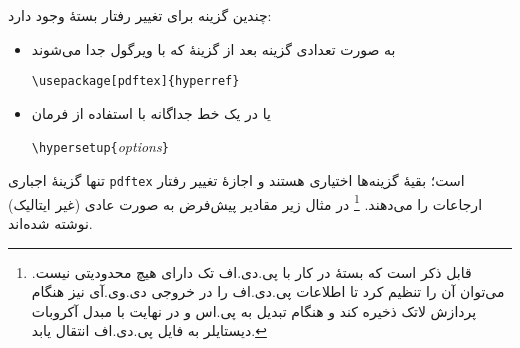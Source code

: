 {چندین گزینه برای تغییر رفتار بستهٔ  وجود دارد:
\begin{itemize}
\item  به صورت تعدادی گزینه بعد از گزینهٔ  که با ویرگول جدا می‌شوند

\setLR
 \verb+\usepackage[pdftex]{hyperref}+
\setRL

\item یا در یک خط جداگانه با استفاده از فرمان
 
\setLR
 \verb+\hypersetup{+\emph{options}\verb+}+
\setRL

\end{itemize}

تنها گزینهٔ اجباری \texttt{pdftex} است؛ بقیهٔ گزینه‌ها اختیاری هستند و اجازهٔ تغییر رفتار ارجاعات را می‌دهند.%
\footnote{قابل ذکر است که بستهٔ  در کار با پی.دی.اف تک دارای هیچ محدودیتی نیست. می‌توان آن را تنظیم کرد تا 
اطلاعات پی.دی.اف را در خروجی دی.وی.آی نیز هنگام پردازش لاتک ذخیره کند و  هنگام تبدیل به پی.اس و در نهایت با مبدل‌ آکروبات دیستایلر به فایل پی.دی.اف انتقال یابد.}  در مثال زیر مقادیر پیش‌فرض به صورت عادی 
(غیر ایتالیک)
نوشته شده‌اند.


}
